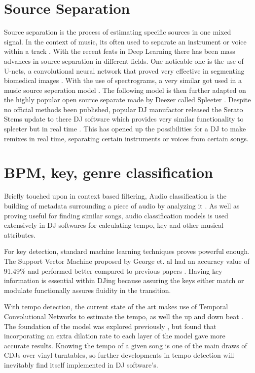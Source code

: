 \section{Source Separation}

Source separation is the process of estimating specific sources in one mixed signal. In the context of music, its often used to separate an instrument or voice within a track \citep{sgouros_efficient_2022}. With the recent feats in Deep Learning there has been mass advances in source separation in different fields. One noticable one is the use of U-nets, a convolutional neural network that proved very effective in segmenting biomedical images \citep{ronneberger_u-net_2015}. With the use of spectrograms, a very similar got used in a music source seperation model \citep{jansson_singing_2017}. The following model is then further adapted on the highly popular open source separate made by Deezer called Spleeter \citep{hennequin_spleeter_2020}. Despite no official methods been published, popular DJ manufactor released the Serato Stems update to there DJ software which provides very similar functionality to spleeter but in real time \citep{kirn_review_2023}. This has opened up the possibilities for a DJ to make remixes in real time, separating certain instruments or voices from certain songs.


\section{BPM, key, genre classification}
Briefly touched upon in context based filtering, Audio classification is the building of metadata surrounding a piece of audio by analyzing it \citep{sharma_audio_2021}. As well as proving useful for finding similar songs, audio classification models is used extensively in DJ softwares for calculating tempo, key and other musical attributes.

For key detection, standard machine learning techniques proves powerful enough. The Support Vector Machine proposed by George et. al had an accuracy value of 91.49\% and performed better compared to previous papers \citep{george_development_2022}. Having key information is essential within DJing because assuring the keys either match or modulate functionally assures fluidity in the transition. 

With tempo detection, the current state of the art makes use of Temporal Convolutional Networks to estimate the tempo, as well the up and down beat \citep{bock_deconstruct_2020}. The foundation of the model was explored previously \citep{bock_multi-task_2019}, but found that incorporating an extra dilation rate to each layer of the model gave more accurate results. Knowing the tempo of a given song is one of the main draws of CDJs over vinyl turntables, so further developments in tempo detection will inevitably find itself implemented in DJ software's.

